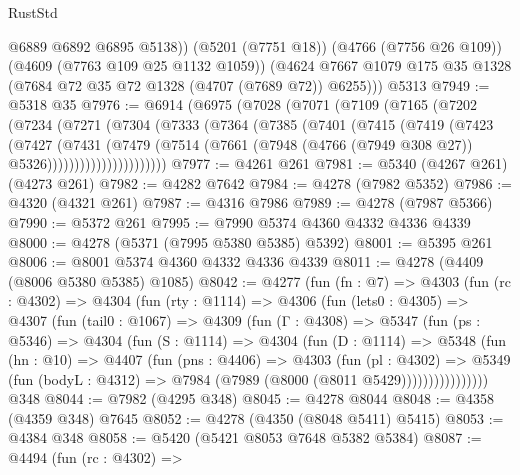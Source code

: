 \begin{lexlean}{RustStd}
\begin{coremodule}
{\begin{coremodule}
{{{{{{{{{{{{{{{{{{{{{{{{{{{{{{{{{{{          @6889
          @6892
          @6895
          @5138))
      (@5201 (@7751 @18))
      (@4766 (@7756 @26 @109))
      (@4609 (@7763 @109 @25 @1132 @1059))
      (@4624 @7667 @1079 @175 @35 @1328 (@7684 @72 @35 @72 @1328 (@4707 (@7689 @72)) @6255)))
    @5313
@7949 := @5318 @35
@7976 := @6914
    (@6975
      (@7028
        (@7071
          (@7109
            (@7165
              (@7202
                (@7234
                  (@7271
                    (@7304
                      (@7333
                        (@7364
                          (@7385
                            (@7401
                              (@7415
                                (@7419
                                  (@7423
                                    (@7427
                                      (@7431
                                        (@7479
                                          (@7514
                                            (@7661
                                              (@7948
                                                (@4766 (@7949 @308 @27))
                                                @5326))))))))))))))))))))))
@7977 := @4261 @261
@7981 := @5340 (@4267 @261) (@4273 @261)
@7982 := @4282 @7642
@7984 := @4278 (@7982 @5352)
@7986 := @4320 (@4321 @261)
@7987 := @4316 @7986
@7989 := @4278 (@7987 @5366)
@7990 := @5372 @261
@7995 := @7990 @5374 @4360 @4332 @4336 @4339
@8000 := @4278 (@5371 (@7995 @5380 @5385) @5392)
@8001 := @5395 @261
@8006 := @8001 @5374 @4360 @4332 @4336 @4339
@8011 := @4278 (@4409 (@8006 @5380 @5385) @1085)
@8042 := @4277
    (fun (fn : @7) =>
    @4303
      (fun (rc : @4302) =>
      @4304
        (fun (rty : @1114) =>
        @4306
          (fun (lets0 : @4305) =>
          @4307
            (fun (tail0 : @1067) =>
            @4309
              (fun (Γ : @4308) =>
              @5347
                (fun (ps : @5346) =>
                @4304
                  (fun (S : @1114) =>
                  @4304
                    (fun (D : @1114) =>
                    @5348
                      (fun (hn : @10) =>
                      @4407
                        (fun (pns : @4406) =>
                        @4303
                          (fun (pl : @4302) =>
                          @5349
                            (fun (bodyL : @4312) => @7984 (@7989 (@8000 (@8011 @5429))))))))))))))))
    @348
@8044 := @7982 (@4295 @348)
@8045 := @4278 @8044
@8048 := @4358 (@4359 @348) @7645
@8052 := @4278 (@4350 (@8048 @5411) @5415)
@8053 := @4384 @348
@8058 := @5420 (@5421 @8053 @7648 @5382 @5384)
@8087 := @4494
    (fun (rc : @4302) =>
}}}}}}}}}}}}}}}}}}}}}}}}}}}}}}}}}}}
\end{coremodule}}
\end{coremodule}
\end{lexlean}
